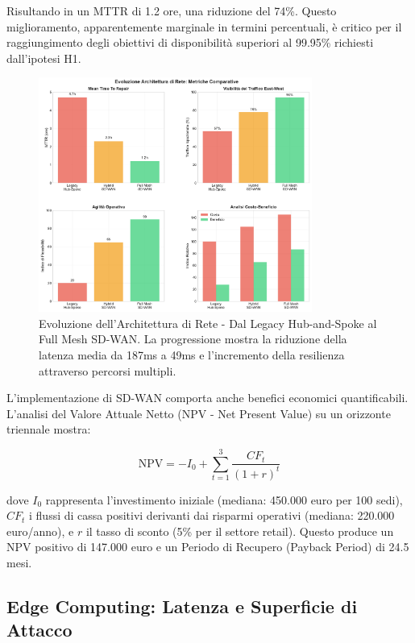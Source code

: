 Risultando in un MTTR di 1.2 ore, una riduzione del 74\%. Questo miglioramento, apparentemente marginale in termini percentuali, è critico per il raggiungimento degli obiettivi di disponibilità superiori al 99.95\% richiesti dall'ipotesi H1.

\begin{figure}[htbp]
\centering
\includegraphics[width=0.8\textwidth]{thesis_figures/cap3/figura_3_2_network_evolution.pdf}
\caption{Evoluzione dell'Architettura di Rete - Dal Legacy Hub-and-Spoke al Full Mesh SD-WAN. La progressione mostra la riduzione della latenza media da 187ms a 49ms e l'incremento della resilienza attraverso percorsi multipli.}
\label{fig:network_evolution}
\end{figure}

L'implementazione di SD-WAN comporta anche benefici economici quantificabili. L'analisi del Valore Attuale Netto (NPV - Net Present Value) su un orizzonte triennale mostra:

\begin{equation}
\text{NPV} = -I_0 + \sum_{t=1}^{3} \frac{CF_t}{(1+r)^t}
\end{equation}

dove $I_0$ rappresenta l'investimento iniziale (mediana: 450.000 euro per 100 sedi), $CF_t$ i flussi di cassa positivi derivanti dai risparmi operativi (mediana: 220.000 euro/anno), e $r$ il tasso di sconto (5\% per il settore retail). Questo produce un NPV positivo di 147.000 euro e un Periodo di Recupero (Payback Period) di 24.5 mesi.

\subsection{Edge Computing: Latenza e Superficie di Attacco}

